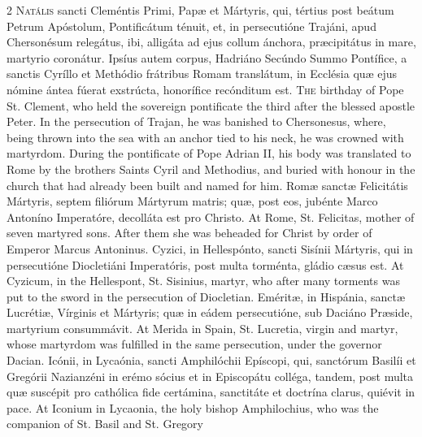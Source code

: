 \begin{paracol}{2}
\lettrine[lines=2]{N}{atális} sancti 
 Cleméntis Primi, Papæ et Mártyris, qui, tértius post beátum Petrum Apóstolum, 
 Pontificátum ténuit, et, in persecutióne Trajáni, apud Chersonésum relegátus, 
 ibi, alligáta ad ejus collum ánchora, præcipitátus in mare, martyrio 
 coronátur. Ipsíus autem corpus, Hadriáno Secúndo Summo Pontífice, a 
 sanctis Cyríllo et Methódio frátribus Romam translátum, in Ecclésia quæ ejus 
 nómine ántea fúerat exstrúcta, honorífice recónditum est.
\switchcolumn
{}
\lettrine[lines=2]{T}{he} birthday of Pope St. Clement, 
 who held the sovereign pontificate the third after the blessed apostle 
 Peter. In the persecution of Trajan, he was banished to Chersonesus, 
 where, being thrown into the sea with an anchor tied to his neck, he was 
 crowned with martyrdom. During the pontificate of Pope Adrian II, his 
 body was translated to Rome by the brothers Saints Cyril and Methodius, and 
 buried with honour in the church that had already been built and named 
 for him.
\switchcolumn*
{}
Romæ sanctæ Felicitátis 
 Mártyris, septem filiórum Mártyrum matris; quæ, post eos, jubénte Marco 
 Antoníno Imperatóre, decolláta est pro Christo.
\switchcolumn
{}
At Rome, St. Felicitas, mother of 
 seven martyred sons. After them she was beheaded for Christ by order 
 of Emperor Marcus Antoninus.
\switchcolumn*
{}
Cyzici, in Hellespónto, 
 sancti Sisínii Mártyris, qui in persecutióne Diocletiáni Imperatóris, post 
 multa torménta, gládio cæsus est.
\switchcolumn
{}
At Cyzicum, in the Hellespont, St. 
 Sisinius, martyr, who after many torments was put to the sword in the 
 persecution of Diocletian.
\switchcolumn*
{}
Eméritæ, in Hispánia, 
 sanctæ Lucrétiæ, Vírginis et Mártyris; quæ in eádem persecutióne, sub 
 Daciáno Præside, martyrium consummávit.
\switchcolumn
{}
At Merida in Spain, St. Lucretia, 
 virgin and martyr, whose martyrdom was fulfilled in the same persecution, 
 under the governor Dacian.
\switchcolumn*
{}
Icónii, in Lycaónia, 
 sancti Amphilóchii Epíscopi, qui, sanctórum Basilíi et Gregórii Nazianzéni 
 in erémo sócius et in Episcopátu colléga, tandem, post multa quæ suscépit 
 pro cathólica fide certámina, sanctitáte et doctrína clarus, quiévit in 
 pace.
\switchcolumn
{}
At Iconium in Lycaonia, the holy 
 bishop Amphilochius, who was the companion of St. Basil and St. Gregory 

\end{paracol}
